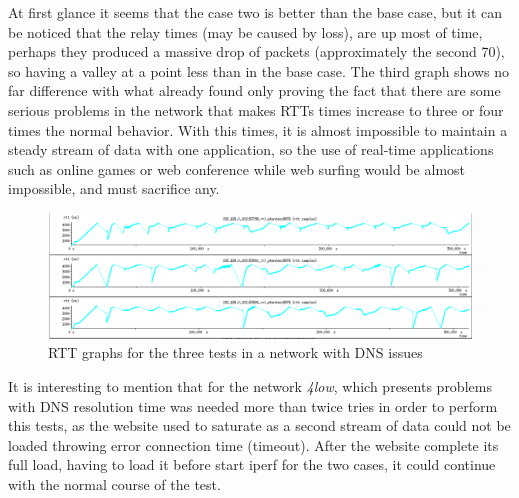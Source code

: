 At first glance it seems that the case two is better than the base case, but
it can be noticed that the relay times (may be caused by loss), are up most of time,
perhaps they produced a massive drop of packets (approximately the second 70),
so having a valley at a point less than in the base case. The third graph
shows no far difference with what already found only proving the fact that
there are some serious problems in the network that makes RTTs times increase
to three or four times the normal behavior. With this times, it is almost
impossible to maintain a steady stream of data with one application, so the
use of real-time applications such as online games or web conference while web
surfing would be almost impossible, and must sacrifice any.

\begin{figure}[ht]
\centering
    \includegraphics[width=\textwidth]{img/n_iperf_4low}
\caption[Iperf: RTT graphs for a network with DNS issues]{RTT graphs for the three tests in a network with DNS issues}
\label{fig:iperf4low}
\end{figure}%

It is interesting to mention that for the network \emph{4low}, which presents problems with DNS resolution time was needed more than twice tries in order to perform this tests, as the website used to saturate as a second stream of data could not be loaded throwing error connection time (timeout). After the website complete its full load, having to load it before start iperf for the two cases, it could continue with the normal course of the test.
